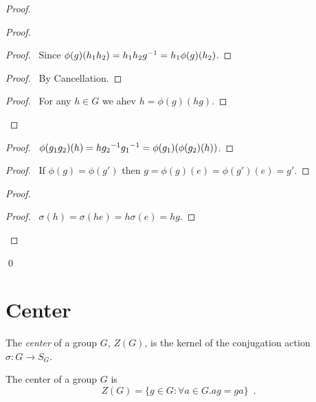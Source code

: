 \begin{proof}
\pf
{}
\begin{proof}
	\begin{proof}
		\pf\ Since $\phi(g)(h_1h_2) = h_1h_2{g}^{-1} = h_1 \phi(g)(h_2)$.
	\end{proof}
	\begin{proof}
		\pf\ By Cancellation.
	\end{proof}
	\begin{proof}
		\pf\ For any $h \in G$ we ahev $h = \phi(g)(hg)$.
	\end{proof}
\end{proof}
\begin{proof}
	\pf\ $\phi(g_1 g_2)(h) = h{g_2}^{-1} {g_1}^{-1} = \phi(g_1)(\phi(g_2)(h))$.
\end{proof}
\begin{proof}
	\pf\ If $\phi(g) = \phi(g')$ then $g = \phi(g)(e) = \phi(g')(e) = g'$.
\end{proof}
	\begin{proof}
		\begin{proof}
		\pf\ $\sigma(h) = \sigma(he) = h \sigma(e) = hg$.
		\end{proof}
	\end{proof}
\qed
\end{proof}

\section{Center}

\begin{df}[Center]
The \emph{center} of a group $G$, $Z(G)$, is the kernel of the conjugation action $\sigma : G \rightarrow S_G$.
\end{df}

\begin{prop}
The center of a group $G$ is
\[ Z(G) = \{ g \in G : \forall a \in G. ag = ga \} \enspace . \]
\end{prop}


